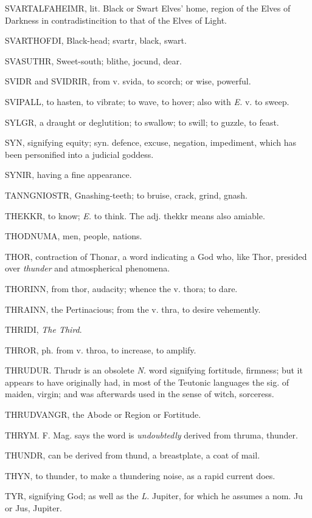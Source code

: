 SVARTALFAHEIMR, lit. Black or Swart Elves' home, region of the Elves
of Darkness in contradistincition to that of the Elves of Light.

SVARTHOFDI, Black-head; svartr, black, swart.

SVASUTHR, Sweet-south; blithe, jocund, dear.

SVIDR and SVIDRIR, from v. svida, to scorch; or wise, powerful.

SVIPALL, to hasten, to vibrate; to wave, to hover; also with \emph{E.} v.
to sweep.

SYLGR, a draught or deglutition; to swallow; to swill; to guzzle, to
feast.

SYN, signifying equity; syn. defence, excuse, negation, impediment,
which has been personified into a judicial goddess.

SYNIR, having a fine appearance.

TANNGNIOSTR, Gnashing-teeth; to bruise, crack, grind, gnash.

THEKKR, to know; \emph{E.} to think. The adj. thekkr means also amiable.

THODNUMA, men, people, nations.

THOR, contraction of Thonar, a word indicating a God who, like Thor,
presided over \emph{thunder} and atmospherical phenomena.

THORINN, from thor, audacity; whence the v. thora; to dare.

THRAINN, the Pertinacious; from the v. thra, to desire vehemently.

THRIDI, \emph{The Third}.

THROR, ph. from v. throa, to increase, to amplify.

THRUDUR. Thrudr is an obsolete \emph{N.} word signifying fortitude,
firmness; but it appears to have originally had, in most of the
Teutonic languages the sig. of maiden, virgin; and was afterwards used
in the sense of witch, sorceress.

THRUDVANGR, the Abode or Region or Fortitude.

THRYM. F. Mag. says the word is \emph{undoubtedly} derived from thruma,
thunder.

THUNDR, can be derived from thund, a breastplate, a coat of mail.

THYN, to thunder, to make a thundering noise, as a rapid current does.

TYR, signifying God; as well as the \emph{L.} Jupiter, for which he assumes
a nom. Ju or Jus, Jupiter.

